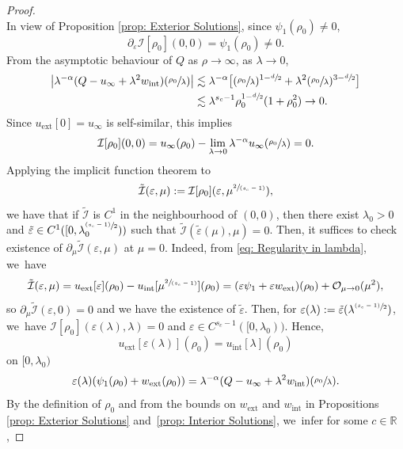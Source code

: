 \documentclass[JEP,XML,SOM,Unicode]{cedram}
\newcommand{\psfrac}[2]{\sfrac{(#1)}{#2}}
\newcommand{\spfrac}[2]{\sfrac{#1}{(#2)}}
\theoremstyle{plain}
\theoremstyle{definition}
\DeclareMathOperator{\exterior}{ext}
\DeclareMathOperator{\interior}{int}
\begin{document}
\begin{proof}
\[\]
In view of Proposition \ref{prop: Exterior Solutions}, since $\psi_1(\rho_0)\neq 0$,
\[
\partial_\varepsilon \mathcal I[\rho_0](0,0)=\psi_1(\rho_0)\neq 0.
\]
From the asymptotic behaviour of $Q$ as $\rho\to\infty$, as $\lambda\to 0$,
\begin{equation}
\label{eq: Regularity in lambda}
\begin{aligned}
\big|\lambda^{-\alpha}(Q-u_\infty+\lambda^2 w_{\interior})(\sfrac{\rho_0}{\lambda})\big|
&\lesssim\lambda^{-\alpha}\big[(\sfrac{\rho_0}{\lambda})^{1-\sfrac{d}{2}}+\lambda^2(\sfrac{\rho_0}{\lambda})^{3-\sfrac{d}{2}}\big]\\
&\lesssim \lambda^{s_c-1}\rho_0^{1-\sfrac{d}{2}}(1+\rho_0^2)\to 0.
\end{aligned}
\end{equation}
Since $u_{\exterior}[0]=u_\infty$ is self-similar, this implies
\[
\mathcal I[\rho_0](0,0)=u_\infty (\rho_0)-\lim_{\lambda\to 0} \lambda^{-\alpha}u_\infty(\sfrac{\rho_0}{\lambda})=0.
\]
Applying the implicit function theorem to
\[
\tilde{\mathcal I}(\varepsilon, \mu):=\mathcal I[\rho_0](\varepsilon,\mu^{\spfrac{2}{s_c-1}}),
\]
we have that if $\tilde{\mathcal I}$ is $C^1$ in the neighbourhood of $(0,0)$, then there exist $\lambda_0>0$ and $\tilde \varepsilon \in C^1([0,\lambda_0^{\psfrac{s_c-1}{2}}))$ such that $\tilde{\mathcal I} (\tilde\varepsilon(\mu),\mu)=0$. Then, it suffices to check existence of $\partial _\mu \tilde{\mathcal I} (\varepsilon,\mu)$ at $\mu=0$. Indeed, from \eqref{eq: Regularity in lambda}, we~have
\[
\tilde{\mathcal I}(\varepsilon, \mu)=u_{\exterior}[\varepsilon](\rho_0)-u_{\interior}[\mu^{\spfrac{2}{s_c-1}}](\rho_0)=(\varepsilon \psi_1+\varepsilon w_{\exterior})(\rho_0)+\mathcal O_{\mu\to0}(\mu^2),
\]
so $\partial _\mu \tilde{\mathcal I} (\varepsilon,0)=0$ and we have the existence of $\tilde \varepsilon$. Then, for $\varepsilon(\lambda):=\tilde \varepsilon (\lambda^{\psfrac{s_c-1}{2}})$, we~have $\mathcal I[\rho_0](\varepsilon(\lambda),\lambda)=0$ and $\varepsilon\in C^{s_c-1}([0,\lambda_0))$. Hence,
\[
u_{\exterior}[\varepsilon(\lambda)](\rho_0)=u_{\interior}[\lambda](\rho_0)
\]
on $[0,\lambda_0)$ \ie
\begin{equation}
\label{eq: Matching}
\varepsilon(\lambda)(\psi_1(\rho_0)+w_{\exterior}(\rho_0))=\lambda^{-\alpha}(Q-u_\infty+\lambda^2w_{\interior})(\sfrac{\rho_0}{\lambda}).
\end{equation}
By the definition of $\rho_0$ and from the bounds on $w_{\exterior}$ and $w_{\interior}$ in Propositions \ref{prop: Exterior Solutions} and~\ref{prop: Interior Solutions}, we~infer for some $c\in \mathbb R$,

\end{proof}
\end{document}
